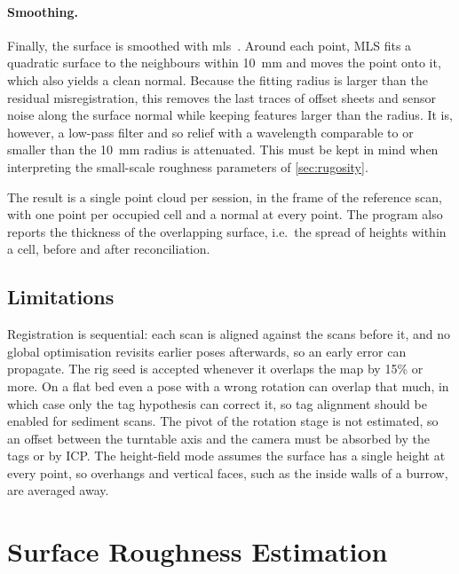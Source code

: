 \paragraph{Smoothing.} Finally, the surface is smoothed with \gls{mls}~\citep{levin1998approximation,alexaComputingRenderingPoint2003}. Around each point, MLS fits a quadratic surface to the neighbours within 10~mm and moves the point onto it, which also yields a clean normal. Because the fitting radius is larger than the residual misregistration, this removes the last traces of offset sheets and sensor noise along the surface normal while keeping features larger than the radius. It is, however, a low-pass filter and so relief with a wavelength comparable to or smaller than the 10~mm radius is attenuated. This must be kept in mind when interpreting the small-scale roughness parameters of \autoref{sec:rugosity}.

The result is a single point cloud per session, in the frame of the reference scan, with one point per occupied cell and a normal at every point. The program also reports the thickness of the overlapping surface, i.e.\ the spread of heights within a cell, before and after reconciliation.

\subsection{Limitations}
\label{subsec:Fuse-Limitations}

Registration is sequential: each scan is aligned against the scans before it, and no global optimisation revisits earlier poses afterwards, so an early error can propagate. The rig seed is accepted whenever it overlaps the map by 15\% or more. On a flat bed even a pose with a wrong rotation can overlap that much, in which case only the tag hypothesis can correct it, so tag alignment should be enabled for sediment scans. The pivot of the rotation stage is not estimated, so an offset between the turntable axis and the camera must be absorbed by the tags or by ICP. The height-field mode assumes the surface has a single height at every point, so overhangs and vertical faces, such as the inside walls of a burrow, are averaged away. 
\section{Surface Roughness Estimation}
\label{sec:rugosity}

